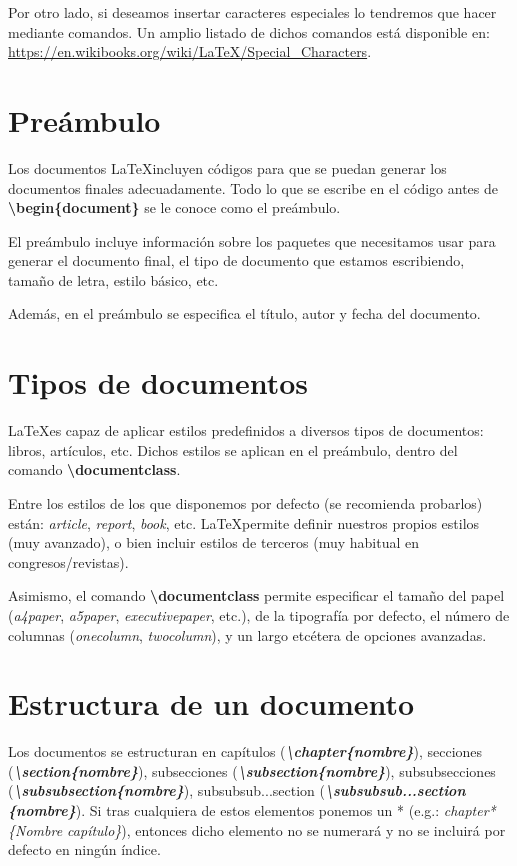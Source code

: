 \documentclass[12pt]{book} %
\begin{document}
Por otro lado, si deseamos insertar caracteres especiales lo tendremos que hacer mediante comandos. Un amplio listado de dichos comandos está disponible en: \url{https://en.wikibooks.org/wiki/LaTeX/Special_Characters}. 

\section{Preámbulo}

Los documentos \LaTeX incluyen códigos para que se puedan generar los documentos finales adecuadamente.  Todo lo que se escribe en el código antes de \textbf{\textbackslash begin\{document\}} se le conoce como el preámbulo.

El preámbulo incluye información sobre los paquetes que necesitamos usar para generar el documento final, el tipo de documento que estamos escribiendo, tamaño de letra, estilo básico, etc.

Además, en el preámbulo se especifica el título, autor y fecha del documento.

\section{Tipos de documentos}

\LaTeX es capaz de aplicar estilos predefinidos a diversos tipos de documentos: libros, artículos, etc. Dichos estilos se aplican en el preámbulo, dentro del comando \textbf{\textbackslash documentclass}.

Entre los estilos de los que disponemos por defecto (se recomienda probarlos) están: \emph{article}, \emph{report}, \emph{book}, etc. \LaTeX permite definir nuestros propios estilos (muy avanzado), o bien incluir estilos de terceros (muy habitual en congresos/revistas).

Asimismo, el comando \textbf{\textbackslash documentclass} permite especificar el tamaño del papel (\emph{a4paper}, \emph{a5paper}, \emph{executivepaper}, etc.), de la tipografía por defecto, el número de columnas (\emph{onecolumn}, \emph{twocolumn}), y un largo etcétera de opciones avanzadas.

\section{Estructura de un documento}

Los documentos se estructuran en capítulos (\textbf{\emph{\textbackslash chapter\{nombre\}}}), secciones (\textbf{\emph{\textbackslash section\{nombre\}}}), subsecciones (\textbf{\emph{\textbackslash subsection\{nombre\}}}), subsubsecciones (\textbf{\emph{\textbackslash subsubsection\{nombre\}}}), subsubsub...section (\textbf{\emph{\textbackslash  subsubsub...section \{nombre\}}}). Si tras cualquiera de estos elementos ponemos un * (e.g.: \emph{chapter*\{Nombre capítulo\}}), entonces dicho elemento no se numerará y no se incluirá por defecto en ningún índice.
\end{document}
